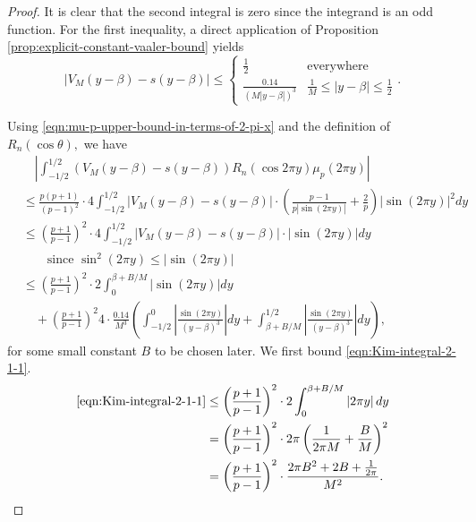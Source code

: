 \documentclass[11pt,letterpaper,reqno]{amsart}
\theoremstyle{definition}
\numberwithin{equation}{section}
\numberwithin{figure}{section}
\numberwithin{table}{section}
\newcommand{\lrp}[1]{\left(#1\right)}
\begin{document}
\begin{proof}
    It is clear that the second integral is zero since the integrand is an odd function. For the first inequality, a direct application of Proposition \ref{prop:explicit-constant-vaaler-bound} yields
    $$\left| V_M(y - \beta) - s(y - \beta) \right| \leq \begin{cases}
    \frac{1}{2} & \text{everywhere}\\
    \frac{0.14}{\left(M | y - \beta| \right)^3} & \frac{1}{M} \leq |y - \beta| \leq \frac{1}{2}
\end{cases}.$$
    
    Using \eqref{eqn:mu-p-upper-bound-in-terms-of-2-pi-x} and the definition of $R_n(\cos \theta),$ we have
    \begin{align}
        & \quad\left| \int_{-1/2}^{1/2}
 \left( V_M(y - \beta ) - s(y - \beta) \right) R_n ( \cos 2 \pi y ) \mu_p(2\pi y) \right|\\
 &\leq \frac{p(p + 1)}{(p - 1)^2} \cdot 4  \int_{-1/2}^{1/2}
 \left| V_M(y - \beta ) - s(y - \beta) \right| \cdot \left( \frac{p - 1}{p \left| \sin(2\pi y) \right|} + \frac{2}{p} \right) \left| \sin(2\pi y) \right|^2 dy\\
 &\leq \left(  \frac{p + 1}{p -1} \right)^2 \cdot 4  \int_{-1/2}^{1/2}
 \left| V_M(y - \beta ) - s(y - \beta) \right| \cdot  \left| \sin(2\pi y) \right| dy\\
 & \qquad \text{since $\sin^2(2\pi y) \leq \left| \sin(2\pi y) \right|$}\\
 &\leq  \left(  \frac{p + 1}{p -1} \right)^2 \cdot 2  \int_{0}^{\beta + B/M}
 \left| \sin(2\pi y) \right| dy \label{eqn:Kim-integral-2-1-1} \\
 & \quad + \left(  \frac{p + 1}{p -1} \right)^2  4  \cdot \frac{0.14}{M^3} \left( \int_{-1/2}^{0}
 \left| \frac{\sin(2\pi y)}{(y - \beta)^3}  \right| dy + \int_{\beta + B/M}^{1/2}
 \left|\frac{\sin(2\pi y)}{(y - \beta)^3} \right| dy \right), \label{eqn:Kim-integral-2-1-2}
 \end{align}
 for some small constant $B$ to be chosen later. We first bound \eqref{eqn:Kim-integral-2-1-1}.
\begin{align}
    \eqref{eqn:Kim-integral-2-1-1} &\leq \left(  \frac{p + 1}{p -1} \right)^2 \cdot 2  \int_{0}^{\beta + B/M}
 \left| 2\pi y \right| dy \\ 
    &= \left(  \frac{p + 1}{p -1} \right)^2 \cdot 2\pi \lrp{\frac{1}{2\pi M} + \frac{B}{M}}^2\\
    &= \left(  \frac{p + 1}{p -1} \right)^2 \cdot \frac{ 2\pi B^2 + 2B + \frac{1}{2\pi}}{M^2}.

\end{align}
\end{proof}
\end{document}
